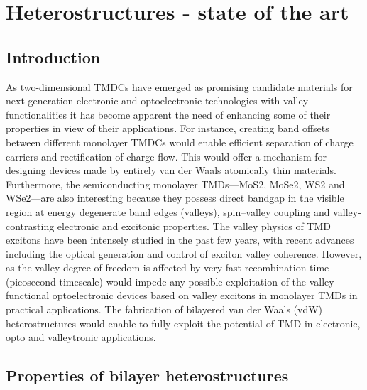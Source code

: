 \chapter{Heterostructures - state of the art}

\section{Introduction}

As two-dimensional TMDCs have emerged as promising candidate materials for next-generation electronic and optoelectronic technologies with valley functionalities it has become apparent the need of enhancing some of their properties in view of their applications. For instance, creating band offsets between different monolayer TMDCs would enable efficient separation of charge carriers and rectification of charge flow. This would offer a mechanism for designing devices made by entirely van der Waals atomically thin materials.  Furthermore, the semiconducting monolayer TMDs—MoS2, MoSe2, WS2 and WSe2—are also interesting because they possess direct bandgap in the visible region at energy degenerate band edges (valleys), spin–valley coupling and valley-contrasting electronic and excitonic properties.
 The valley physics of TMD excitons have been intensely studied in the past few years, with recent advances including the optical generation and control of exciton valley coherence. However, as the valley degree of freedom is affected by very fast recombination time (picosecond timescale) would impede any possible exploitation of the valley-functional optoelectronic devices based on valley excitons in monolayer TMDs in practical applications. The fabrication of bilayered van der Waals (vdW) heterostructures would enable to fully exploit the potential of TMD in electronic, opto and valleytronic applications.

\section{Properties of bilayer heterostructures}

